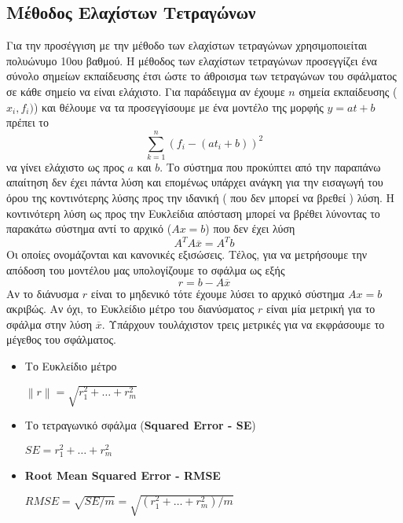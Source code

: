 \documentclass[Second Project.tex]{subfiles}
\newcommand{\norm}[1]{\left\lVert#1\right\rVert}
\begin{document}
\subsection{ Μέθοδος Ελαχίστων Τετραγώνων }

Για την προσέγγιση με την μέθοδο των ελαχίστων τετραγώνων χρησιμοποιείται πολυώνυμο 10ου βαθμού. Η μέθοδος των 
ελαχίστων τετραγώνων προσεγγίζει ένα σύνολο σημείων εκπαίδευσης έτσι ώστε το άθροισμα των τετραγώνων του σφάλματος
σε κάθε σημείο να είναι ελάχιστο. Για παράδειγμα αν έχουμε $n$ σημεία εκπαίδευσης ($x_{i}, f_{i})$) και θέλουμε να τα
προσεγγίσουμε με ένα μοντέλο της μορφής $y = at + b$ πρέπει το 
\begin{equation*}
    \sum_{k=1}^{n} (f_{i} - ( at_{i} + b))^{2}
\end{equation*}
να γίνει ελάχιστο ως προς $a$ και $b$. Το σύστημα που προκύπτει από την παραπάνω απαίτηση δεν έχει πάντα λύση και 
επομένως υπάρχει ανάγκη για την εισαγωγή του όρου της κοντινότερης λύσης προς την ιδανική ( που δεν μπορεί να βρεθεί )
 λύση. Η κοντινότερη λύση ως προς την Ευκλείδια απόσταση μπορεί να βρέθει λύνοντας το παρακάτω σύστημα αντί το αρχικό
($Ax = b$) που δεν έχει λύση
\begin{equation*}
    A^{T}A\overline{x} = A^{T}b
\end{equation*}
Οι οποίες ονομάζονται και κανονικές εξισώσεις. Τέλος, για να μετρήσουμε την απόδοση του μοντέλου μας υπολογίζουμε το 
σφάλμα ως εξής 
\begin{equation*}
    r = b - A\overline{x}
\end{equation*}
Αν το διάνυσμα $r$ είναι το μηδενικό τότε έχουμε λύσει το αρχικό σύστημα $Ax = b$ ακριβώς. Αν όχι, το Ευκλείδιο μέτρο
του διανύσματος $r$ είναι μία μετρική για το σφάλμα στην λύση $\overline{x}$. Υπάρχουν τουλάχιστον τρεις μετρικές 
για να εκφράσουμε το μέγεθος του σφάλματος.
\newpage
\begin{itemize}
    \item Το Ευκλείδιο μέτρο
        \begin{center}
            $\norm{r} = \sqrt{r_{1}^{2} + \dots + r_{m}^{2}}$
        \end{center}
    \item Το τετραγωνικό σφάλμα (\textlatin{\textbf{Squared Error - SE}})
        \begin{center}
            $SE = r_{1}^2 + \dots + r_{m}^2$
        \end{center}
    \item \textlatin{\textbf{Root Mean Squared Error - RMSE}}
        \begin{center}
            $RMSE = \sqrt{SE/m} = \sqrt{(r_{1}^2 + \dots + r_{m}^2)/m}$
        \end{center}
\end{itemize}
\end{document}
